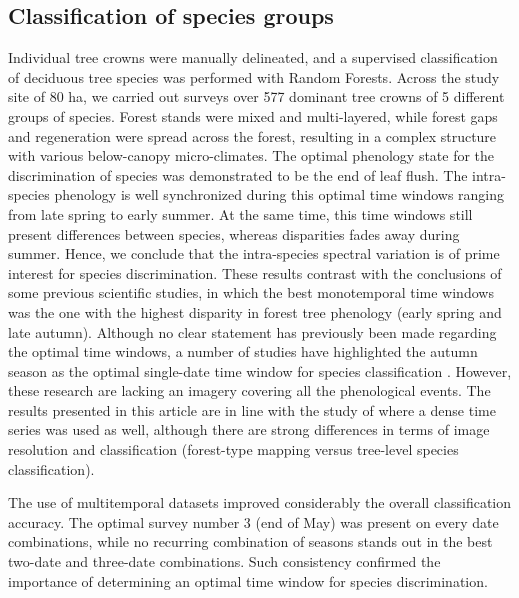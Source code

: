 \documentclass[remotesensing,article,submit,moreauthors,pdftex,12pt,a4paper]{mdpi} %
\begin{document}
\subsection{Classification of species groups}

Individual tree crowns were manually delineated, and a supervised classification of deciduous tree species was performed with Random Forests. 
Across the study site of 80 ha, we carried out surveys over 577 dominant tree crowns of 5 different groups of species. 
Forest stands were mixed and multi-layered, while forest gaps and regeneration were spread across the forest, resulting in a complex structure with various below-canopy micro-climates. 
The optimal phenology state for the discrimination of species was demonstrated to be the end of leaf flush. 
The intra-species phenology is well synchronized during this optimal time windows ranging from late spring to early summer. 
At the same time, this time windows still present differences between species, whereas disparities fades away during summer. 
Hence, we conclude that the intra-species spectral variation is of prime interest for species discrimination. 
These results contrast with the conclusions of some previous scientific studies, in which the best monotemporal time windows was the one with the highest disparity in forest tree phenology (early spring and late autumn). 
Although no clear statement has previously been made regarding the optimal time windows, a number of studies have highlighted the autumn season as the optimal single-date time window for species classification \citep{key_comparison_2001,hill_mapping_2010, somers_multitemporal_2013}. 
However, these research are lacking an imagery covering all the phenological events.
The results presented in this article are in line with the study of \citeauthor{kempeneers_data_2011} \cite{kempeneers_data_2011} where a dense time series was used as well, although there are strong differences in terms of image resolution and classification (forest-type mapping versus tree-level species classification).

The use of multitemporal datasets improved considerably the overall classification accuracy. 
The optimal survey number 3 (end of May) was present on every date combinations, while no recurring combination of seasons stands out in the best two-date and three-date combinations.
Such consistency confirmed the importance of determining an optimal time window for species discrimination.
\end{document}

